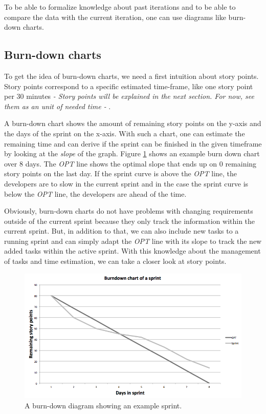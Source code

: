 To be able to formalize knowledge about past iterations and to be able to compare the data with the current iteration, one can use diagrams like burn-down charts.

\subsection{Burn-down charts}
To get the idea of burn-down charts, we need a first intuition about story points. Story points correspond to a specific estimated time-frame, like one story point per 30 minutes \emph{- Story points will be explained in the next section. For now, see them as an unit of needed time - }.

A burn-down chart shows the amount of remaining story points on the y-axis and the days of the sprint on the x-axis. With such a chart, one can estimate the remaining time and can derive if the sprint can be finished in the given timeframe by looking at the \textit{slope} of the graph. Figure \ref{Burndown example} shows an example burn down chart over 8 days. The \emph{OPT} line shows the optimal slope that ends up on 0 remaining story points on the last day. If the sprint curve is above the \emph{OPT} line, the developers are to slow in the current sprint and in the case the sprint curve is below the \emph{OPT} line, the developers are ahead of the time. 

Obviously, burn-down charts do not have problems with changing requirements outside of the current sprint because they only track the information within the current sprint. 
But, in addition to that, we can also include new tasks to a running sprint and can simply adapt the \emph{OPT} line with its slope to track the new added tasks within the active sprint. With this knowledge about the management of tasks and time estimation, we can take a closer look at story points.

\begin{figure}[th]
\centerline{\includegraphics[width=1\textwidth]{gfx/burndown}}
\caption{A burn-down diagram showing an example sprint.}
\label{Burndown example}
\end{figure}

